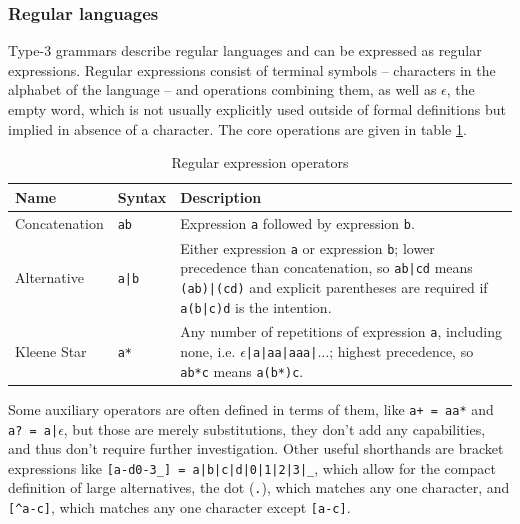 			\subsubsection{Regular languages}
			
			Type-3 grammars describe regular languages and can be expressed as regular expressions. Regular expressions consist of terminal symbols -- characters in the alphabet of the language -- and operations combining them, as well as $\epsilon$, the empty word, which is not usually explicitly used outside of formal definitions but implied in absence of a character. The core operations are given in table \ref{tab:re_ops}.
			
			
			\begin{table}
			\begin{center}
			\begin{tabular}{ l l p{10cm} }
			\toprule
			Name         & Syntax & Description \\
			\midrule
			Concatenation & \lstinline$ab$  & Expression \lstinline$a$ followed by expression \lstinline$b$. \\
			Alternative   & \lstinline$a|b$ & Either expression \lstinline$a$ or expression \lstinline$b$; lower precedence than concatenation, so \lstinline$ab|cd$ means \lstinline$(ab)|(cd)$ and explicit parentheses are required if \lstinline$a(b|c)d$ is the intention. \\
			Kleene Star   & \lstinline$a*$  & Any number of repetitions of expression \lstinline$a$, including none, i.e. $\epsilon$\lstinline$|a|aa|aaa|$$\ldots$; highest precedence, so \lstinline$ab*c$ means \lstinline$a(b*)c$. \\
			\bottomrule
			\end{tabular}
			\caption{Regular expression operators}\label{tab:re_ops}
			\end{center}
			\end{table}
			
			Some auxiliary operators are often defined in terms of them, like \lstinline$a+ = aa*$ and \lstinline$a? = a|$$\epsilon$, but those are merely substitutions, they don't add any capabilities, and thus don't require further investigation. Other useful shorthands are bracket expressions like \lstinline$[a-d0-3_] = a|b|c|d|0|1|2|3|_$, which allow for the compact definition of large alternatives, the dot (\lstinline$.$), which matches any one character, and \lstinline$[^a-c]$, which matches any one character except \lstinline$[a-c]$.
			
